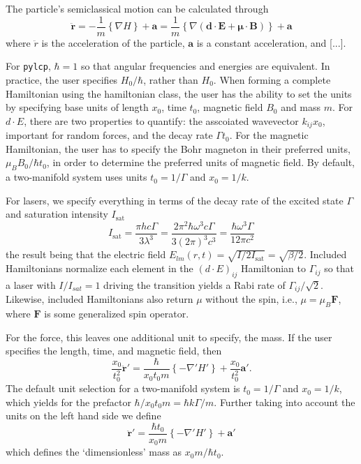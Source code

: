 \documentclass[final,5p,times,twocolumn]{elsarticle}
\newcounter{bla}
\begin{document}
The particle's semiclassical motion can be calculated through
\begin{equation}
	\ddot{\mathbf{r}} = -\frac{1}{m} \left\{\nabla H\right\} + \mathbf{a} = \frac{1}{m}\left\{\nabla (\mathbf{d} \cdot \mathbf{E} + \mathbf{\mu}\cdot \mathbf{B})\right\} + \mathbf{a}
\end{equation}
where $\ddot{r}$ is the acceleration of the particle, $\mathbf{a}$ is a constant acceleration, and [...].

For {\tt pylcp}, $\hbar=1$ so that angular frequencies and energies are equivalent.  In practice, the user specifies $H_0/\hbar$, rather than $H_0$. 
When forming a complete Hamiltonian using the hamiltonian class, the user has
the ability to set the units by specifying base units of length $x_0$, time
$t_0$, magnetic field $B_0$ and mass $m$.  For $d\cdot E$, there are two properties
to quantify: the asscoiated wavevector $k_{ij}x_0$, important for random forces, 
and the decay rate $\Gamma t_0$.  For the magnetic Hamiltonian, the user has to 
specify the Bohr magneton in their preferred units, $\mu_B B_0/\hbar t_0$, in 
order to determine the preferred units of magnetic field.  By default, a two-manifold system uses units $t_0=1/\Gamma$ and $x_0=1/k$. 

For lasers, we specify everything in terms of the decay rate of the excited state $\Gamma$ and saturation intensity $I_\text{sat}$
\begin{equation}
    I_\text{sat} = \frac{\pi h c \Gamma}{3\lambda^3} = \frac{2\pi^2 \hbar \omega^3 c \Gamma}{3(2\pi)^3 c^3} = \frac{\hbar \omega^3 \Gamma}{12 \pi c^2}
\end{equation}
the result being that the electric field $E_{lm}(r,t) = \sqrt{I/2I_\text{sat}} = \sqrt{\beta/2}$.
Included Hamiltonians normalize each element in the $(d\cdot E)_{ij}$ Hamiltonian
to $\Gamma_{ij}$ so that a laser with $I/I_{sat}=1$ driving the transition
yields a Rabi rate of $\Gamma_{ij}/\sqrt{2}$.  Likewise, included Hamiltonians
also return $\mu$ without the spin, i.e., $\mu = \mu_B \mathbf{F}$, where
$\mathbf{F}$ is some generalized spin operator.


For the force, this leaves one additional unit to specify, the mass.  If the
user specifies the length, time, and magnetic field, then
\begin{equation}
    \frac{x_0}{t_0^2} \ddot{\mathbf{r}}' = \frac{\hbar}{x_0 t_0 m}\left\{ -\nabla' H'\right\} + \frac{x_0}{t_0^2}\mathbf{a}'.
\end{equation}
The default unit selection for a two-manifold system is $t_0=1/\Gamma$ and $x_0=1/k$, which yields for the prefactor $\hbar/x_0 t_0 m = \hbar k \Gamma/m$.   Further taking into account the units on the left hand side we define
\begin{equation}
	\ddot{\mathbf{r}}' = \frac{\hbar t_0}{x_0 m}\left\{ -\nabla' H'\right\} + \mathbf{a}'
\end{equation}
which defines the `dimensionless' mass as $x_0 m/\hbar t_0$.
\end{document}
